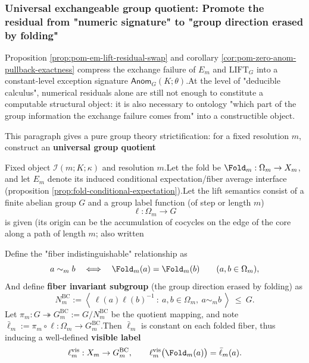 \subsubsection{Universal exchangeable group quotient: Promote the residual from "numeric signature" to "group direction erased by folding"}\label{subsec:pom-bc-quotient}Proposition \ref{prop:pom-em-lift-residual-swap} and corollary \ref{cor:pom-zero-anom-pullback-exactness} compress the exchange failure of \(E_m\) and \(\mathrm{LIFT}_G\) into a constant-level exception signature \(\mathsf{Anom}_G(K;\theta)\).At the level of "deducible calculus", numerical residuals alone are still not enough to constitute a computable structural object: it is also necessary to ontology "which part of the group information the exchange failure comes from" into a constructible object.\par
This paragraph gives a pure group theory strictification: for a fixed resolution \(m\), construct an \textbf {universal group quotient}
\begin{definition}\label{def:pom-bc-quotient}Fixed object \(\mathcal{I}(m;K;\kappa)\) and resolution \(m\).Let the fold be \(\Fold_m:\Omega_m\to X_m\), and let \(E_m\) denote its induced conditional expectation/fiber average interface (proposition \ref{prop:fold-conditional-expectation}).Let the lift semantics consist of a finite abelian group \(G\) and a group label function (of step or length \(m\))\[
\ell:\Omega_m\to G
\]
is given (its origin can be the accumulation of cocycles on the edge of the core along a path of length \(m\); also written\par
Define the "fiber indistinguishable" relationship as\[
a\sim_m b\quad\Longleftrightarrow\quad \Fold_m(a)=\Fold_m(b)\qquad(a,b\in\Omega_m),
\]
And define \textbf{fiber invariant subgroup} (the group direction erased by folding) as\[
N^{\mathrm{BC}}_m
:=\left\langle\ \ell(a)\ell(b)^{-1}\ :\ a,b\in\Omega_m,\ a\sim_m b\ \right\rangle\ \le\ G.
\]
Let \(\pi_m:G\twoheadrightarrow G^{\mathrm{BC}}_m:=G/N^{\mathrm{BC}}_m\) be the quotient mapping, and note \(\bar\ell_m:=\pi_m\circ \ell:\Omega_m\to G^{\mathrm{BC}}_m\).Then \(\bar\ell_m\) is constant on each folded fiber, thus inducing a well-defined \textbf{visible label}\[
\ell^{\mathrm{vis}}_m:X_m\to G^{\mathrm{BC}}_m,
\qquad
\ell^{\mathrm{vis}}_m\bigl(\Fold_m(a)\bigr)=\bar\ell_m(a).
\]
\end{definition}

